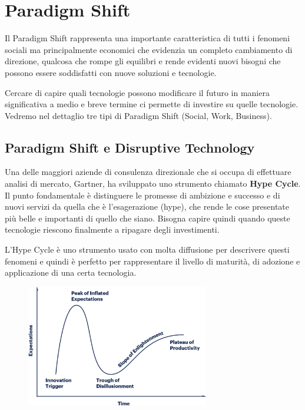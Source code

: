 \chapter{Paradigm Shift}
Il Paradigm Shift rappresenta una importante caratteristica di tutti i fenomeni sociali ma principalmente economici che evidenzia un completo cambiamento di direzione, qualcosa che rompe gli equilibri e rende evidenti nuovi bisogni che possono essere soddisfatti con nuove soluzioni e tecnologie. 

Cercare di capire quali tecnologie possono modificare il futuro in maniera significativa a medio e breve termine ci permette di investire su quelle tecnologie. Vedremo nel dettaglio tre tipi di Paradigm Shift (Social, Work, Business).

\section{Paradigm Shift e Disruptive Technology}
Una delle maggiori aziende di consulenza direzionale che si occupa di effettuare analisi di mercato, Gartner, ha sviluppato uno strumento chiamato \textbf{Hype Cycle}. Il punto fondamentale è distinguere le promesse di ambizione e successo e di nuovi servizi da quella che è l'esagerazione (hype), che rende le cose presentate più belle e importanti di quello che siano. Bisogna capire quindi quando queste tecnologie riescono finalmente a ripagare degli investimenti. 

\noindent L'Hype Cycle è uno strumento usato con molta diffusione per descrivere questi fenomeni e quindi è perfetto per rappresentare il livello di maturità, di adozione e applicazione di una certa tecnologia. 

\begin{figure}[ht]
    \centering
    \includegraphics[width=8cm]{./Images/cap4/4.1.jpg}
\end{figure}

